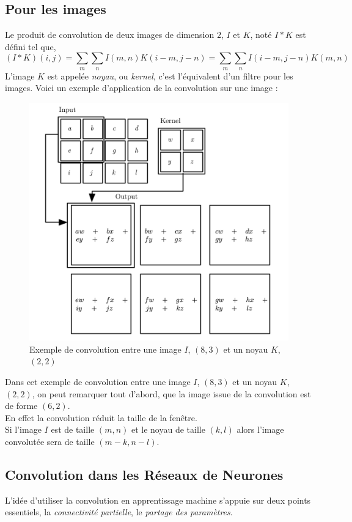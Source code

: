 \documentclass[10pt,a4paper]{report}
\begin{document}
			\subsection{Pour les images}
			Le produit de convolution de deux images de dimension $2$, $I$ et $K$, noté $I * K$ est défini tel que,
			$$(I*K)(i,j) = \sum_{m}\sum_{n}{I(m,n)K(i-m,j-n)} = \sum_{m}\sum_{n}{I(i-m,j-n)K(m,n)}$$
			L'image $K$ est appelée \emph{noyau}, ou \emph{kernel}, c'est l'équivalent d'un filtre pour les images.
			Voici un exemple d'application de la convolution sur une image :
			\begin{figure}[H]
				\begin{center}
					\includegraphics[scale=0.25]{Images/convolution.png}
					\caption{Exemple de convolution entre une image $I$, $(8,3)$ et un noyau $K$, $(2,2)$}
				\end{center}
			\end{figure}
			Dans cet exemple de convolution entre une image $I$, $(8,3)$ et un noyau $K$, $(2,2)$, on peut remarquer tout d'abord, que la image issue de la convolution est de forme $(6,2)$.\\
			En effet la convolution réduit la taille de la fenêtre.\\
			Si l'image $I$ est de taille $(m,n)$ et le noyau de taille $(k,l)$ alors l'image convolutée sera de taille $(m-k,n-l)$.
		\subsection{Convolution dans les Réseaux de Neurones}
		L'idée d'utiliser la convolution en apprentissage machine s'appuie sur deux points essentiels, la \emph{connectivité partielle}, le \emph{partage des paramètres}.
\end{document}
